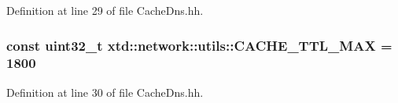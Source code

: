 Definition at line 29 of file Cache\-Dns.\-hh.

\hypertarget{namespacextd_1_1network_1_1utils_adb4767541db3a79016a24142db705161}{
\subsubsection[{C\-A\-C\-H\-E\-\_\-\-T\-T\-L\-\_\-\-M\-A\-X}]{\setlength{\rightskip}{0pt plus 5cm}const uint32\-\_\-t xtd\-::network\-::utils\-::\-C\-A\-C\-H\-E\-\_\-\-T\-T\-L\-\_\-\-M\-A\-X = 1800}}\label{namespacextd_1_1network_1_1utils_adb4767541db3a79016a24142db705161}


Definition at line 30 of file Cache\-Dns.\-hh.

